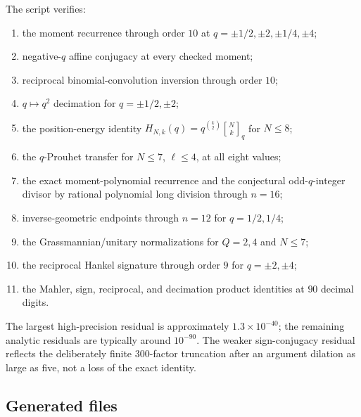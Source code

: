 \documentclass[11pt,oneside]{article}
\numberwithin{equation}{section}
\theoremstyle{definition}
\theoremstyle{remark}
\newcommand{\qbinom}[3]{\genfrac{[}{]}{0pt}{}{#1}{#2}_{#3}}
\begin{document}
The script verifies:
\begin{enumerate}
\item the moment recurrence through order $10$ at
      $q=\pm1/2,\pm2,\pm1/4,\pm4$;
\item negative-$q$ affine conjugacy at every checked moment;
\item reciprocal binomial-convolution inversion through order $10$;
\item $q\mapsto q^2$ decimation for $q=\pm1/2,\pm2$;
\item the position-energy identity
      $H_{N,k}(q)=q^{\binom k2}\qbinom Nkq$ for $N\le8$;
\item the $q$-Prouhet transfer for $N\le7$, $\ell\le4$, at all eight values;
\item the exact moment-polynomial recurrence and the conjectural odd-$q$-integer
      divisor by rational polynomial long division through $n=16$;
\item inverse-geometric endpoints through $n=12$ for $q=1/2,1/4$;
\item the Grassmannian/unitary normalizations for $Q=2,4$ and $N\le7$;
\item the reciprocal Hankel signature through order $9$ for
      $q=\pm2,\pm4$;
\item the Mahler, sign, reciprocal, and decimation product identities at
      $90$ decimal digits.
\end{enumerate}

The largest high-precision residual is approximately $1.3\times10^{-40}$; the
remaining analytic residuals are typically around $10^{-90}$.  The weaker
sign-conjugacy residual reflects the deliberately finite $300$-factor
truncation after an argument dilation as large as five, not a loss of the exact
identity.

\subsection{Generated files}
\end{document}

